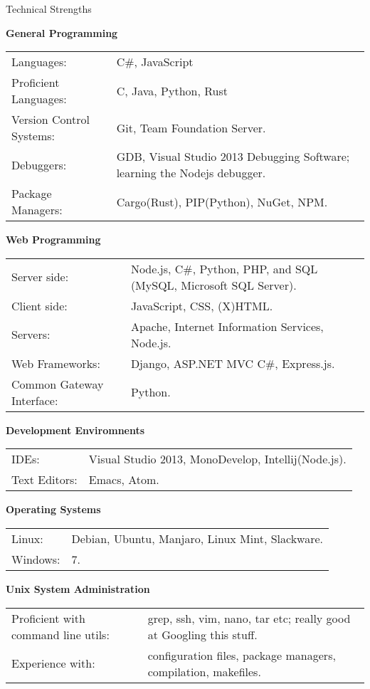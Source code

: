 \documentclass{resume} %
\newcommand{\btab}[2]{
	\bgroup
	\def\arraystretch{#1}
	\begin{tabular}{#2}
}
\newcommand{\etab}{
	\end{tabular} \smallskip
	\egroup
}
\begin{document}
\begin{rSection}{Technical Strengths}

{\bf General Programming}

\btab{1.1}{ l l }
	Languages: & C\#, JavaScript \\
	Proficient Languages: & C, Java, Python, Rust \\
	Version Control Systems: & Git, Team Foundation Server. \\
	Debuggers: & GDB, Visual Studio 2013 Debugging Software; learning the Nodejs debugger. \\
	Package Managers: & Cargo(Rust), PIP(Python), NuGet, NPM. \\
\etab

{\bf Web Programming}

\btab{1.1}{ l l }
	Server side: & Node.js, C\#, Python, PHP, and SQL (MySQL, Microsoft SQL Server). \\
	Client side: & JavaScript, CSS, (X)HTML. \\
	Servers: & Apache, Internet Information Services, Node.js. \\
	Web Frameworks: & Django, ASP.NET MVC C\#, Express.js. \\
	Common Gateway Interface: & Python. \\
\etab

{\bf Development Enviromnents}

\btab{1.1}{ l l }
	IDEs: & Visual Studio 2013, MonoDevelop, Intellij(Node.js). \\
	Text Editors: & Emacs, Atom. \\
\etab

{\bf Operating Systems}

\btab{1.1}{ l l }
	Linux: & Debian, Ubuntu, Manjaro, Linux Mint, Slackware. \\
	Windows: & 7. \\
\etab

{\bf Unix System Administration}

\btab{1.1}{ l l }
	Proficient with command line utils: & grep, ssh, vim, nano, tar etc; really good at Googling this stuff. \\
	Experience with: & configuration files, package managers, compilation, makefiles. \\
\etab

\end{rSection}
\end{document}
